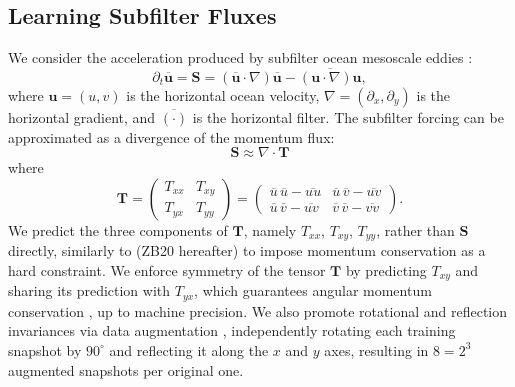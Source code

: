 \documentclass[draft]{agujournal2019}
\begin{document}
\subsection{Learning Subfilter Fluxes}
We consider the acceleration produced by subfilter ocean mesoscale eddies \cite<subfilter forcing,>{Bolton2019}:
\begin{equation}
    \partial_t \overline{\mathbf{u}} = \mathbf{S} = (\overline{\mathbf{u}} \cdot \nabla ) \overline{\mathbf{u}} - \overline{(\mathbf{u} \cdot \nabla) \mathbf{u}},  \label{eq:subfilter_forcing}
\end{equation}
where $\mathbf{u}=(u,v)$ is the horizontal ocean  velocity, $\nabla=(\partial_x, \partial_y)$ is the horizontal gradient, and $\overline{(\cdot)}$ is the horizontal filter. The subfilter forcing can be approximated \cite{loose2023comparing} as a divergence of the momentum flux:
\begin{equation}
    \mathbf{S} \approx \nabla \cdot \mathbf{T} \label{eq:momentum_div}
\end{equation}
where
\begin{equation}
    \mathbf{T} = \begin{pmatrix}
        T_{xx} & T_{xy} \\
        T_{yx} & T_{yy}
    \end{pmatrix} = \begin{pmatrix}
        \overline{u}  \, \overline{u} - \overline{u u} & \overline{u} \, \overline{v} - \overline{uv} \\
        \overline{u} \, \overline{v} - \overline{uv} & 
        \overline{v}  \, \overline{v} - \overline{v v}
    \end{pmatrix}. \label{eq:momentum_flux}
\end{equation}
We predict the three components of $ \mathbf{T}$, namely   $T_{xx}$, $T_{xy}$, $T_{yy}$, rather than $\mathbf{S}$ directly, similarly to  (ZB20 hereafter) to impose momentum conservation as a hard constraint. We enforce symmetry of the tensor $\mathbf{T}$ by predicting $T_{xy}$ and sharing its prediction with $T_{yx}$, which guarantees angular momentum conservation \cite[Section 17.3.3]{griffies2018fundamentals}, up to machine precision. We also promote rotational and reflection invariances via data augmentation \cite{guan2022learning}, independently rotating each training snapshot by $90^\circ$ and reflecting it along the $x$ and $y$ axes, resulting in $8=2^3$ augmented snapshots per original one.
\end{document}
